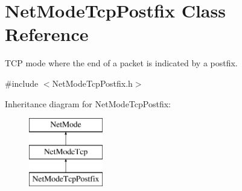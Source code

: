\hypertarget{class_net_mode_tcp_postfix}{
\section{NetModeTcpPostfix Class Reference}
\label{class_net_mode_tcp_postfix}
}


TCP mode where the end of a packet is indicated by a postfix.  




{\ttfamily \#include $<$NetModeTcpPostfix.h$>$}

Inheritance diagram for NetModeTcpPostfix:\begin{figure}[H]
\begin{center}
\leavevmode
\includegraphics[height=3.000000cm]{class_net_mode_tcp_postfix}
\end{center}
\end{figure}
